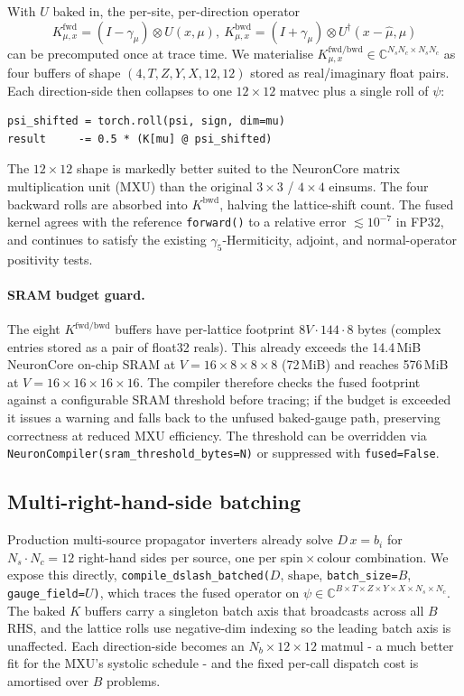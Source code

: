 \documentclass[a4paper,11pt]{article}
\begin{document}
With $U$ baked in, the per-site, per-direction operator
\begin{equation}
K^{\mathrm{fwd}}_{\mu,x} = (I{-}\gamma_\mu)\!\otimes\! U(x,\mu),\ 
K^{\mathrm{bwd}}_{\mu,x} = (I{+}\gamma_\mu)\!\otimes\! U^{\dagger}(x{-}\hat\mu,\mu)
\end{equation}
can be precomputed once at trace time. We materialise
$K^{\mathrm{fwd/bwd}}_{\mu,x}\in\mathbb{C}^{N_sN_c\times N_sN_c}$ as four
buffers of shape $(4,T,Z,Y,X,12,12)$ stored as real/imaginary float
pairs. Each direction-side then collapses to one $12{\times}12$ matvec
plus a single roll of $\psi$:
\begin{lstlisting}
psi_shifted = torch.roll(psi, sign, dim=mu)
result     -= 0.5 * (K[mu] @ psi_shifted)
\end{lstlisting}
The $12{\times}12$ shape is markedly better suited to the NeuronCore
matrix multiplication unit (MXU) than the original $3{\times}3$ /
$4{\times}4$ einsums. The four backward rolls are absorbed into
$K^{\mathrm{bwd}}$, halving the lattice-shift count. The fused kernel
agrees with the reference \texttt{forward()} to a relative error
$\lesssim 10^{-7}$ in FP32, and continues to satisfy
the existing $\gamma_5$-Hermiticity, adjoint, and normal-operator
positivity tests.

\paragraph*{SRAM budget guard.}
The eight $K^{\mathrm{fwd/bwd}}$ buffers have per-lattice footprint
$8V\!\cdot\!144\!\cdot\!8$ bytes (complex entries stored as a pair of
float32 reals).  This already exceeds the 14.4\,MiB NeuronCore on-chip
SRAM at $V=16{\times}8{\times}8{\times}8$ (72\,MiB) and reaches
576\,MiB at $V=16{\times}16{\times}16{\times}16$.  The compiler therefore checks the fused
footprint against a configurable SRAM threshold before tracing; if the
budget is exceeded it issues a warning and falls back to the unfused
baked-gauge path, preserving correctness at reduced MXU efficiency.
The threshold can be overridden via
\texttt{NeuronCompiler(sram\_threshold\_bytes=N)} or suppressed with
\texttt{fused=False}.

\subsection{Multi-right-hand-side batching}

Production multi-source propagator inverters already solve $D\,x = b_i$
for $N_s\!\cdot\!N_c=12$ right-hand sides per source, one per
spin\,$\times$\,colour combination. We expose this directly,
\texttt{compile\_dslash\_batched(}$D$, $\mathrm{shape}$,
\texttt{batch\_size=}$B$, \texttt{gauge\_field=}$U$\texttt{)},
which traces the fused operator on
$\psi\in\mathbb{C}^{B\times T\times Z\times Y\times X\times N_s\times N_c}$.
The baked $K$ buffers carry a singleton batch axis that broadcasts
across all $B$ RHS, and the lattice rolls use negative-dim indexing so
the leading batch axis is unaffected. Each direction-side becomes an
$N_b{\times}12{\times}12$ matmul - a much better fit for the MXU's
systolic schedule - and the fixed per-call dispatch cost is
amortised over $B$ problems.
\end{document}

